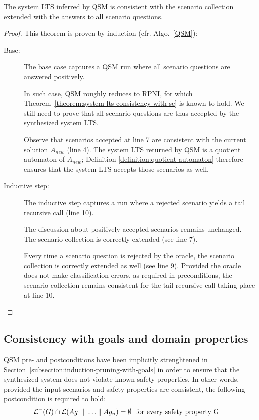 \begin{theorem}
The system LTS inferred by QSM is consistent with the scenario collection extended with the answers to all scenario questions.

\begin{proof}
This theorem is proven by induction (cfr. Algo.~\ref{QSM}):
\begin{description}
\item[Base:] The base case captures a QSM run where all scenario questions are answered positively. 

In such case, QSM roughly reduces to RPNI, for which Theorem~\ref{theorem:system-lts-consistency-with-sc} is known to hold. We still need to prove that all scenario questions are thus accepted by the synthesized system LTS. 

Observe that scenarios accepted at line 7 are consistent with the current solution $A_{new}$ (line 4). The system LTS returned by QSM is a quotient automaton of $A_{new}$; Definition \ref{definition:quotient-automaton} therefore ensures that the system LTS accepts those scenarios as well.

\item[Inductive step:] The inductive step captures a run where a rejected scenario yields a tail recursive call (line 10).

The discussion about positively accepted scenarios remains unchanged. The scenario collection is correctly extended (see line 7).

Every time a scenario question is rejected by the oracle, the scenario collection is correctly extended as well (see line 9). Provided the oracle does not make classification errors, as required in preconditions, the scenario collection remains consistent for the tail recursive call taking place at line 10.
\end{description}
\end{proof}
\end{theorem}


\subsection{Consistency with goals and domain properties\label{subsection:proof-with-domain-knowledge}}

QSM pre- and postconditions have been implicitly strenghtened in Section~\ref{subsection:induction-pruning-with-goals} in order to ensure that the synthesized system does not violate known safety properties. In other words, provided the input scenarios and safety properties are consistent, the following postcondition is required to hold:
\begin{align}
&\mathcal{L}^-(G) \cap \mathcal{L}(Ag_1 \parallel \ldots \parallel Ag_n) = \emptyset \mbox{~~for every safety property~G}\label{consistency-of-system-lts-with-goals}
\end{align}

